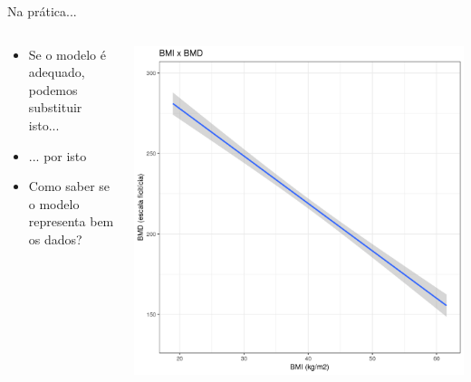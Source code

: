 \documentclass{beamer}
\begin{document}
\begin{frame}{\scriptsize Na prática...}
  \begin{columns}
    \begin{column}{5cm}
      \begin{itemize}
        \small
      \item \alert{Se o modelo é adequado}, podemos substituir isto...
        \bigskip
      \item ... por isto
        \bigskip
      \item<2> Como saber se o modelo representa bem os dados?
      \end{itemize}
    \end{column}
    \begin{column}{5cm}
      \begin{center}
        \includegraphics[width=1.1\textwidth]{Cap18-19/pratica-rls3}
      \end{center}
    \end{column}
  \end{columns}
\end{frame}
\end{document}
